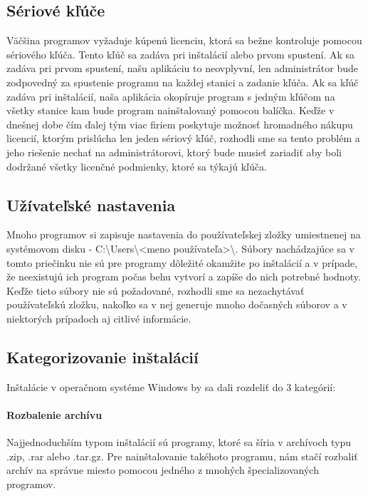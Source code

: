 \subsection{Sériové kľúče}
Väčšina programov vyžaduje kúpenú licenciu, ktorá sa bežne kontroluje pomocou sériového kľúča. Tento kľúč sa zadáva pri inštalácií alebo prvom spustení. Ak sa zadáva pri prvom spustení, našu aplikáciu to neovplyvní, len administrátor bude zodpovedný za spustenie programu na každej stanici a zadanie kľúča. Ak sa kľúč zadáva pri inštalácií, naša aplikácia okopíruje program s jedným kľúčom na všetky stanice kam bude program nainštalovaný pomocou balíčka. Keďže v dnešnej dobe čím ďalej tým viac firiem poskytuje možnosť hromadného nákupu licencií, ktorým prislúcha len jeden sériový kľúč, rozhodli sme sa tento problém a jeho riešenie nechať na administrátorovi, ktorý bude musieť zariadiť aby boli dodržané všetky licenčné podmienky, ktoré sa týkajú kľúča.

\subsection{Užívateľské nastavenia}
\label{sec:userset}
Mnoho programov si zapisuje nastavenia do používateľskej zložky umiestnenej na systémovom disku - C:\textbackslash Users\textbackslash\textless meno používateľa\textgreater\textbackslash. Súbory nachádzajúce sa v tomto priečinku nie sú pre programy dôležité okamžite po inštalácií a v prípade, že neexistujú ich program počas behu vytvorí a zapíše do nich potrebné hodnoty. Keďže tieto súbory nie sú požadované, rozhodli sme sa nezachytávať používateľskú zložku, nakoľko sa v nej generuje mnoho dočasných súborov a v niektorých prípadoch aj citlivé informácie.

\subsection{Kategorizovanie inštalácií}
\label{sec:categories}
Inštalácie v operačnom systéme Windows by sa dali rozdeliť do 3 kategórií:

\paragraph{Rozbalenie archívu}
Najjednoduchším typom inštalácií sú programy, ktoré sa šíria v archívoch typu .zip, .rar alebo .tar.gz. Pre nainštalovanie takéhoto programu, nám stačí rozbaliť archív na správne miesto pomocou jedného z mnohých špecializovaných programov.

